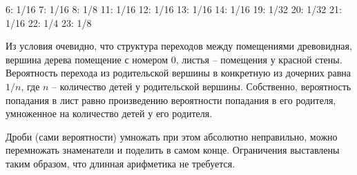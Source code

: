 \begin{myverbbox}[\small]{\voutput}
    6: 1/16
    7: 1/16
    8: 1/8
    11: 1/16
    12: 1/16
    13: 1/16
    14: 1/16
    19: 1/32
    20: 1/32
    21: 1/16
    22: 1/4
    23: 1/8    
\end{myverbbox}

\solutionSection

Из условия очевидно, что структура переходов между помещениями древовидная, вершина дерева помещение с номером 0, листья -- помещения у красной стены. Вероятность перехода из родительской вершины в конкретную из дочерних равна $1/n$, где $n$ -- количество детей у родительской вершины. Собственно, вероятность попадания в лист равно произведению вероятности попадания в его родителя, умноженное на количество детей у его родителя.

Дроби (сами вероятности) умножать при этом абсолютно неправильно, можно перемножать знаменатели и поделить в самом конце. Ограничения выставлены таким образом, что длинная арифметика не требуется. 

